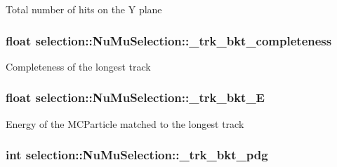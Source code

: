 Total number of hits on the Y plane \hypertarget{classselection_1_1NuMuSelection_a569e5b1199f57a2becbd28ee0202baae}{
\subsubsection[{\-\_\-trk\-\_\-bkt\-\_\-completeness}]{\setlength{\rightskip}{0pt plus 5cm}float selection\-::\-Nu\-Mu\-Selection\-::\-\_\-trk\-\_\-bkt\-\_\-completeness\hspace{0.3cm}{\ttfamily [private]}}}\label{classselection_1_1NuMuSelection_a569e5b1199f57a2becbd28ee0202baae}
Completeness of the longest track \hypertarget{classselection_1_1NuMuSelection_a1957763f4a43de544b42a9e04cf83afa}{
\subsubsection[{\-\_\-trk\-\_\-bkt\-\_\-\-E}]{\setlength{\rightskip}{0pt plus 5cm}float selection\-::\-Nu\-Mu\-Selection\-::\-\_\-trk\-\_\-bkt\-\_\-\-E\hspace{0.3cm}{\ttfamily [private]}}}\label{classselection_1_1NuMuSelection_a1957763f4a43de544b42a9e04cf83afa}
Energy of the M\-C\-Particle matched to the longest track \hypertarget{classselection_1_1NuMuSelection_afc6475990e683ff735846740580cac9b}{
\subsubsection[{\-\_\-trk\-\_\-bkt\-\_\-pdg}]{\setlength{\rightskip}{0pt plus 5cm}int selection\-::\-Nu\-Mu\-Selection\-::\-\_\-trk\-\_\-bkt\-\_\-pdg\hspace{0.3cm}{\ttfamily [private]}}}\label{classselection_1_1NuMuSelection_afc6475990e683ff735846740580cac9b}

